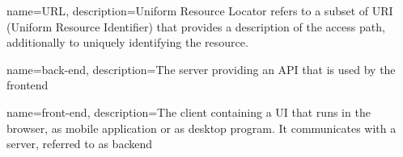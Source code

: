 {
    name={URL},
    description={Uniform Resource Locator refers to a subset of URI (Uniform Resource Identifier) that provides a description of the access path, additionally to uniquely identifying the resource.}
}

{
    name={back-end},
    description={The server providing an API that is used by the \gls{frontend}}
}

{
    name={front-end},
    description={The client containing a UI that runs in the browser, as mobile application or as desktop program. It communicates with a server, referred to as \gls{backend}}
}

